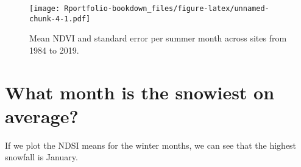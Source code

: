\documentclass[
]{book}
\newenvironment{Shaded}{\begin{snugshade}}{\end{snugshade}}
\newcommand{\AttributeTok}[1]{\textcolor[rgb]{0.77,0.63,0.00}{#1}}
\newcommand{\CommentTok}[1]{\textcolor[rgb]{0.56,0.35,0.01}{\textit{#1}}}
\newcommand{\FunctionTok}[1]{\textcolor[rgb]{0.00,0.00,0.00}{#1}}
\newcommand{\NormalTok}[1]{#1}
\newcommand{\OtherTok}[1]{\textcolor[rgb]{0.56,0.35,0.01}{#1}}
\newcommand{\SpecialCharTok}[1]{\textcolor[rgb]{0.00,0.00,0.00}{#1}}
\newcommand{\StringTok}[1]{\textcolor[rgb]{0.31,0.60,0.02}{#1}}
\begin{document}
\begin{figure}
\centering
\texttt{[image: Rportfolio-bookdown\_files/figure-latex/unnamed-chunk-4-1.pdf]}
\caption{\label{fig:unnamed-chunk-4}Mean NDVI and standard error per summer month across sites from 1984 to 2019.}
\end{figure}

\hypertarget{what-month-is-the-snowiest-on-average}{%
\section{What month is the snowiest on average?}\label{what-month-is-the-snowiest-on-average}}

If we plot the NDSI means for the winter months, we can see that the highest snowfall is January.

\begin{Shaded}
\end{Shaded}
\end{document}
